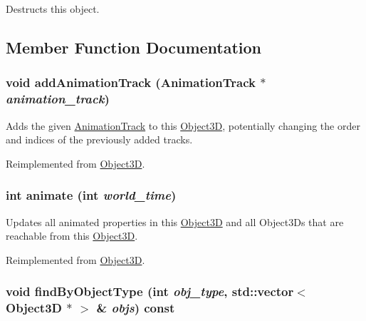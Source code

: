 Destructs this object. 

\subsection{Member Function Documentation}
\hypertarget{classm3g_1_1VertexBuffer_415c0b110f95410ded9b85e5d99a496b}{
\subsubsection[{addAnimationTrack}]{\setlength{\rightskip}{0pt plus 5cm}void addAnimationTrack ({\bf AnimationTrack} $\ast$ {\em animation\_\-track})}}
\label{classm3g_1_1VertexBuffer_415c0b110f95410ded9b85e5d99a496b}


Adds the given \hyperlink{classm3g_1_1AnimationTrack}{AnimationTrack} to this \hyperlink{classm3g_1_1Object3D}{Object3D}, potentially changing the order and indices of the previously added tracks. 

Reimplemented from \hyperlink{classm3g_1_1Object3D_415c0b110f95410ded9b85e5d99a496b}{Object3D}.\hypertarget{classm3g_1_1VertexBuffer_82cfeb67ca66b93e2ca7bda9a4f0e2aa}{
\subsubsection[{animate}]{\setlength{\rightskip}{0pt plus 5cm}int animate (int {\em world\_\-time})}}
\label{classm3g_1_1VertexBuffer_82cfeb67ca66b93e2ca7bda9a4f0e2aa}


Updates all animated properties in this \hyperlink{classm3g_1_1Object3D}{Object3D} and all Object3Ds that are reachable from this \hyperlink{classm3g_1_1Object3D}{Object3D}. 

Reimplemented from \hyperlink{classm3g_1_1Object3D_8aad1ceab4c2a03609c8a42324ce484d}{Object3D}.\hypertarget{classm3g_1_1VertexBuffer_4dadb21b568b0230fac106f15040138c}{
\subsubsection[{findByObjectType}]{\setlength{\rightskip}{0pt plus 5cm}void findByObjectType (int {\em obj\_\-type}, \/  std::vector$<$ {\bf Object3D} $\ast$ $>$ \& {\em objs}) const}}
\label{classm3g_1_1VertexBuffer_4dadb21b568b0230fac106f15040138c}


